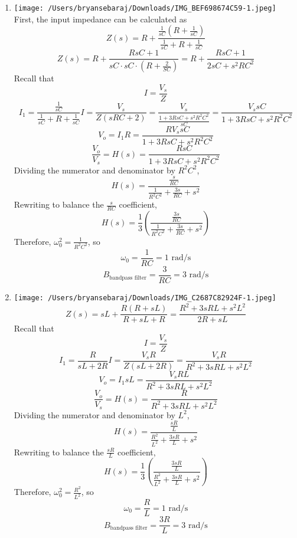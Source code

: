 \documentclass{article}
\begin{document}
\begin{enumerate}[label=(\alph*)]
    \item   \texttt{[image: /Users/bryansebaraj/Downloads/IMG\_BEF698674C59-1.jpeg]} \\ 
        First, the input impedance can be calculated as $$Z(s)=R + \frac{\frac{1}{sC}\left(R + \frac{1}{sC} \right)}{\frac{1}{sC} + R + \frac{1}{sC}}$$
        $$Z(s) = R+ \frac{RsC + 1}{sC \cdot sC \cdot \left( R + \frac{2}{SC}\right)}=R+\frac{RsC + 1}{2sC + s^2RC^2}$$
        Recall that $$I=\frac{V_s}{Z}$$
        $$I_1=\frac{\frac{1}{sC}}{\frac{1}{sC} + R + \frac{1}{sC}}I = \frac{V_s}{Z(sRC + 2)}=\frac{V_s}{\frac{1 + 3RsC + s^2R^2C^2}{sC}}=\frac{V_ssC}{1 + 3RsC + s^2R^2C^2}$$
        $$V_o=I_1R=\frac{RV_ssC}{1 + 3RsC + s^2R^2C^2}$$
        $$\frac{V_o}{V_s}=H(s)=\frac{RsC}{1 + 3RsC + s^2R^2C^2}$$
        Dividing the numerator and denominator by $R^2C^2$,
        $$H(s)=\frac{\frac{s}{RC}}{\frac{1}{R^2C^2} + \frac{3s}{RC} + s^2}$$
        Rewriting to balance the $\frac{s}{RC}$ coefficient, 
        $$H(s)=\frac{1}{3}\left( \frac{\frac{3s}{RC}}{\frac{1}{R^2C^2} + \frac{3s}{RC} + s^2} \right)$$
        Therefore, $\omega^2_0=\frac{1}{R^2C^2}$, so $$\omega_0=\frac{1}{RC}=1 \text{ rad/s}$$
        $$B_{\text{bandpass filter}}=\frac{3}{RC}= 3 \text{ rad/s}$$


    \item \texttt{[image: /Users/bryansebaraj/Downloads/IMG\_C2687C82924F-1.jpeg]}
        $$Z(s)=sL + \frac{R(R + sL)}{R + sL + R}=\frac{R^2 + 3sRL + s^2L^2}{2R+sL}$$
        Recall that $$I=\frac{V_s}{Z}$$
        $$I_1=\frac{R}{sL + 2R}I= \frac{V_sR}{Z(sL + 2R)}=\frac{V_sR}{R^2+3sRL+s^2L^2}$$
        $$V_o=I_1sL=\frac{V_sRL}{R^2+3sRL+s^2L^2}$$
        $$\frac{V_o}{V_s}=H(s)=\frac{R}{R^2+3sRL+s^2L^2}$$
        Dividing the numerator and denominator by $L^2$,
        $$H(s)=\frac{\frac{sR}{L}}{\frac{R^2}{L^2} + \frac{3sR}{L} + s^2}$$
        Rewriting to balance the $\frac{sR}{L}$ coefficient,
        $$H(s)=\frac{1}{3}\left( \frac{\frac{3sR}{L}}{\frac{R^2}{L^2} + \frac{3sR}{L} + s^2} \right)$$
        Therefore, $\omega^2_0=\frac{R^2}{L^2}$, so $$\omega_0=\frac{R}{L}=1 \text{ rad/s}$$
        $$B_{\text{bandpass filter}}=\frac{3R}{L}= 3 \text{ rad/s}$$
\end{enumerate}
\end{document}
